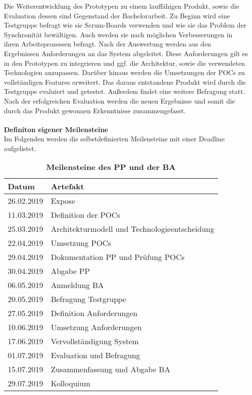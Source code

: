 \documentclass[12pt,titlepage]{scrartcl}
\begin{document}
Die Weiterentwicklung des Prototypen zu einem lauffähigen Produkt, sowie die Evaluation dessen sind Gegenstand der Bachelorarbeit. Zu Beginn wird eine Testgruppe befragt wie sie Scrum-Boards verwenden und wie sie das Problem der Synchronität bewältigen. Auch werden sie nach möglichen Verbesserungen in ihren Arbeitsprozessen befragt. Nach der Auswertung werden aus den Ergebnissen Anforderungen an das System abgeleitet. Diese Anforderungen gilt es in den Prototypen zu integrieren und ggf. die Architektur, sowie die verwendeten Technologien anzupassen. Darüber hinaus werden die Umsetzungen der POCs zu vollständigen Features erweitert. Das daraus entstandene Produkt wird durch die Testgruppe evaluiert und getestet. Außerdem findet eine weitere Befragung statt. Nach der erfolgreichen Evaluation werden die neuen Ergebnisse und somit die durch das Produkt gewonnen Erkenntnisse zusammengefasst.
\\ \\
\textbf{Definiton eigener Meilensteine} \\
Im Folgenden werden die selbstdefinierten Meilensteine mit einer Deadline aufgelistet.
\begin{table}[H]
\centering
\caption{\textbf{Meilensteine des PP und der BA}}
\begin{tabular}{|c|l|}
\hline
\multicolumn{1}{|l|}{\textbf{Datum}} & {\textbf{Artefakt}} \\ \hline
26.02.2019                                 & Expose \\ \hline
11.03.2019                                 & Definition der POCs \\ \hline
25.03.2019                                       & Architekturmodell und Technologieentscheidung \\ \hline
22.04.2019                                       & Umsetzung POCs                                  \\ \hline
29.04.2019                                       & Dokumentation PP und Prüfung POCs                                \\ \hline
30.04.2019                                       & Abgabe PP \\ \hline
06.05.2019                                       & Anmeldung BA \\ \hline
20.05.2019                                       & Befragung Testgruppe \\ \hline
27.05.2019                                       & Definition Anforderungen \\ \hline
10.06.2019                                       & Umsetzung Anforderungen \\ \hline
17.06.2019                                       & Vervollständigung System \\ \hline
01.07.2019                                       & Evaluation und Befragung \\ \hline
15.07.2019                                       & Zusammenfassung und Abgabe BA \\ \hline
29.07.2019                                       & Kolloquium \\ \hline
\end{tabular}
\end{table}

\newpage


 	
\end{document}
